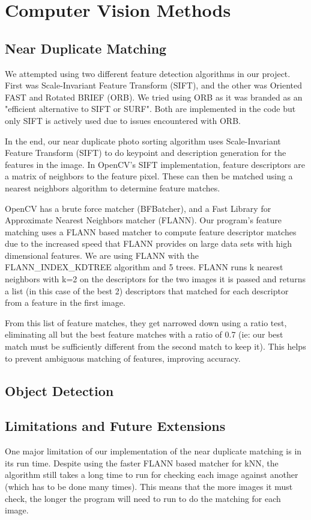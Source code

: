 \documentclass[12pt]{article}
\begin{document}
\section{Computer Vision Methods}
\subsection{Near Duplicate Matching}

	We attempted using two different feature detection algorithms in our project. First was Scale-Invariant Feature Transform (SIFT), and the other was Oriented FAST and Rotated BRIEF (ORB). We tried using ORB as it was branded as an "efficient alternative to SIFT or SURF". Both are implemented in the code but only SIFT is actively used due to issues encountered with ORB.
	
	In the end, our near duplicate photo sorting algorithm uses Scale-Invariant Feature Transform (SIFT) to do keypoint and description generation for the features in the image. In OpenCV's SIFT implementation, feature descriptors are a matrix of neighbors to the feature pixel. These can then be matched using a nearest neighbors algorithm to determine feature matches. 
	
	OpenCV has a brute force matcher (BFBatcher), and a Fast Library for Approximate Nearest Neighbors matcher (FLANN). Our program's feature matching uses a FLANN based matcher to compute feature descriptor matches due to the increased speed that FLANN provides on large data sets with high dimensional features. We are using FLANN with the FLANN\_INDEX\_KDTREE algorithm and 5 trees. FLANN runs k nearest neighbors with k=2 on the descriptors for the two images it is passed and returns a list (in this case of the best 2) descriptors that matched for each descriptor from a feature in the first image.
	
	From this list of feature matches, they get narrowed down using a ratio test, eliminating all but the best feature matches with a ratio of 0.7 (ie: our best match must be  sufficiently different from the second match to keep it). This helps to prevent ambiguous matching of features, improving accuracy.

\subsection{Object Detection}
	

\subsection{Limitations and Future Extensions}
	One major limitation of our implementation of the near duplicate matching is in its run time. Despite using the faster FLANN based matcher for kNN, the algorithm still takes a long time to run for checking each image against another (which has to be done many times). This means that the more images it must check, the longer the program will need to run to do the matching for each image. 
	
\end{document}
